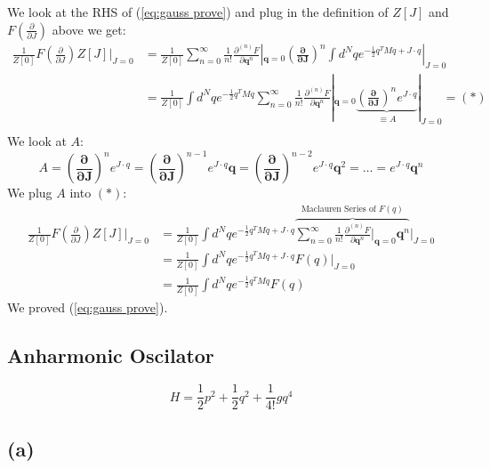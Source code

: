 \documentclass{article}
\begin{document}
We look at the RHS of (\ref{eq:gauss prove}) and plug in the definition of $Z[J]$ and $ F(\frac{\partial}{\partial J})$ above we get:
\begin{equation*}
\begin{split}
   \frac{1}{Z[0]}F\left(\frac{\partial}{\partial J}\right) Z[J]|_{J=0} 
    &= \frac{1}{Z[0]}\sum_{n=0}^{\infty} \frac{1}{n!}\frac{\partial^{(n)}F}{\partial \mathbf{q}^n}|_{\mathbf{q}=0}(\mathbf{\frac{\partial}{\partial J}})^n\int d^N q e^{-\frac{1}{2} q^T M q+J \cdot q}|_{J=0}\\
    &=\frac{1}{Z[0]}\int d^N q e^{-\frac{1}{2} q^T M q} \sum_{n=0}^{\infty} \frac{1}{n!}\frac{\partial^{(n)}F}{\partial \mathbf{q}^n}|_{\mathbf{q}=0}\underbrace{(\mathbf{\frac{\partial}{\partial J}})^ne^{J \cdot q}}_{\equiv A}|_{J=0}=(*)\\   
\end{split}
\end{equation*}
We look at $A$:
\begin{equation} \label{eq:A}
        A=(\mathbf{\frac{\partial}{\partial J}})^ne^{J \cdot q}=(\mathbf{\frac{\partial}{\partial J}})^{n-1}e^{J \cdot q}\mathbf{q}=(\mathbf{\frac{\partial}{\partial J}})^{n-2}e^{J \cdot q}\mathbf{q}^2=\dots = e^{J \cdot q}\mathbf{q}^n
\end{equation}
We plug $A$ into $(*)$:
\begin{equation*}
\begin{split}
    \frac{1}{Z[0]}F\left(\frac{\partial}{\partial J}\right) Z[J]|_{J=0}&=\frac{1}{Z[0]}\int d^N q e^{-\frac{1}{2} q^T M q+J\cdot q}\overbrace{ \sum_{n=0}^{\infty} \frac{1}{n!}\frac{\partial^{(n)}F}{\partial \mathbf{q}^n}|_{\mathbf{q}=0}\mathbf{q}^n}^{\text{Maclauren Series of $F(q)$}}|_{J=0}\\
    &=\frac{1}{Z[0]}\int d^N q e^{-\frac{1}{2} q^T M q+J\cdot q}F(q)|_{J=0}\\
    &=\frac{1}{Z[0]}\int d^N q e^{-\frac{1}{2} q^T M q}F(q)
\end{split}
\end{equation*}
We proved (\ref{eq:gauss prove}).
\subsection*{Anharmonic Oscilator}
\begin{equation*}
    H=\frac{1}{2}p^2+\frac{1}{2}q^2+\frac{1}{4!}gq^4
\end{equation*}
\subsection*{(a)}
\end{document}

